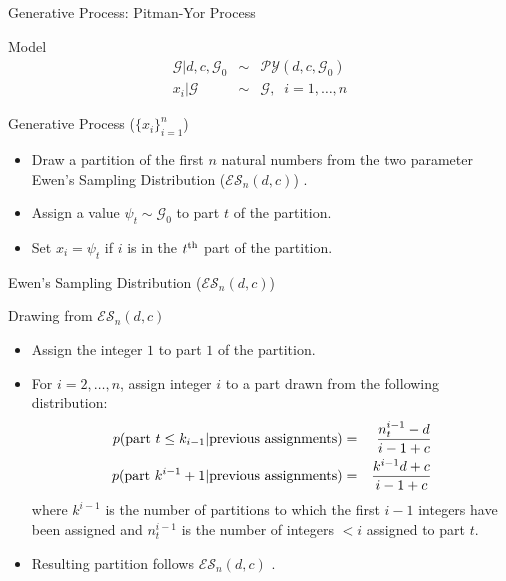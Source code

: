 \documentclass{beamer}
\newcommand{\G}{\mathcal{G}}
\newcommand{\PY}{\mathcal{P}\mathcal{Y}}
\newcommand{\ES}{\mathcal{E}\mathcal{S}}
\begin{document}
\begin{frame}[t]{Generative Process: Pitman-Yor Process}

	\begin{block}{Model}
		\vspace{-.5cm}
		\begin{eqnarray*}
			\G | d,c, \G_0 &\sim& \PY(d,c,\G_0) \\
			x_i | \G &\sim& \G, \;\; i=1,\ldots,n
		\end{eqnarray*}
	\end{block}

	\begin{block}{Generative Process ($\{ x_i \}_{i = 1}^n$)}
		\begin{itemize}
			\item Draw a partition of the first $n$ natural numbers from the two parameter Ewen's Sampling Distribution ($\ES_n(d,c)$) \cite{Ewens1995}.
			\item Assign a value $\psi_t \sim \G_0$ to part $t$ of the partition.
			\item Set $x_i = \psi_t$ if $i$ is in the $t^{\rm th}$ part of the partition.
		\end{itemize}
	\end{block}	
\end{frame}

\begin{frame}[t]{Ewen's Sampling Distribution ($\ES_n(d,c)$)}

	\begin{block}{Drawing from $\ES_n(d,c)$}
		\begin{itemize}
			\item Assign the integer $1$ to part $1$ of the partition.
			\item {For $i = 2, \ldots, n$, assign integer $i$ to a part drawn from the following distribution: \\
				\vspace{-.65cm}
				\begin{eqnarray*}
					p({\rm part~}t \leq k_{i-1}  | {\rm previous~assignments}) &=& \frac{n^{i-1}_t - d}{i-1 + c}\\
					p({\rm  part~} k^{i-1} + 1 | {\rm previous~ assignments}) &=& \frac{k^{i-1}d + c}{i-1 + c}\\
				\end{eqnarray*}
				\noindent where $k^{i-1}$ is the number of partitions to which the first $i-1$ integers have been assigned and $n^{i-1}_t$ is the number of integers $< i$ assigned to part $t$.
			}
			\item{Resulting partition follows $\ES_n(d,c)$  \cite{Pitman1995}}.
		\end{itemize}
	\end{block}
	
\end{frame}
\end{document}
